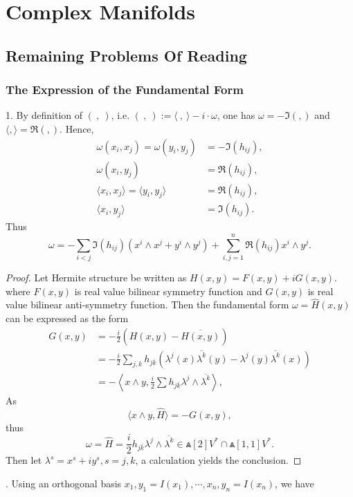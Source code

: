 \chapter{Complex Manifolds}
\section{Remaining Problems Of Reading}
\subsection{The Expression of the Fundamental Form}
1. By definition of $(~ ,~ )$, i.e. $(~,~) := \langle ~,~\rangle-i\cdot \omega$, one has $\omega=-\Im( , )$ and $\langle , \rangle=\Re( , )$. Hence,
\begin{subequations}\label{w expression}
  \begin{align}
\omega(x_i,x_j) =\omega(y_i,y_j) &=-\Im(h_{ij}),\\
\omega(x_i,y_j) &=\Re(h_{ij}),\\
\langle x_i ,x_j\rangle =\langle y_i,y_j\rangle &=\Re(h_{ij}),\\
\langle x_i,y_j\rangle &=\Im(h_{ij}).
\end{align}
\end{subequations}
Thus
\[
  \omega=-\sum_{i<j} \Im(h_{ij})(x^i\wedge x^j+y^i\wedge y^j )+\sum_{i,j=1}^{n}\Re(h_{ij})x^i\wedge y^j.
\]
\begin{proof}
  Let Hermite structure be written as $H(x,y)=F(x,y)+iG(x,y)$. where $F(x,y)$ is  real value bilinear symmetry function and $G(x,y)$ is  real value bilinear anti-symmetry function. Then the fundamental form $\omega=\widehat{H}(x,y)$ can be expressed as the form
  \begin{align*}
    G(x,y) &=-\frac{i}{2}(H(x,y)-\overline{H(x,y)})\\
    &=-\frac{i}{2}\sum_{j,k} h_{j\overline{k}} (\lambda^j(x)\overline{\lambda^k}(y)-\lambda^j (y)\overline{\lambda^k}(x))\\
    &=-\left\langle x\wedge y,\frac{i}{2}\sum h_{j\overline{k}} \lambda^j\wedge\overline{\lambda^k}\right\rangle,
  \end{align*}
  As 
  \[
    \langle x\wedge y, \widehat{H}\rangle=-G(x,y),
  \]
  thus 
  \[
    \omega=\widehat{H}=\frac{i}{2}h_{j\overline{k}} \lambda^j\wedge\overline{\lambda^k}\in \Wedge[2] V^*\cap \Wedge[1,1] V^*.
  \]
    Then let $\lambda^s=x^s+i y^s, s=j,k$, a calculation yields the conclusion\cite{LDG}.
\end{proof}
. Using an orthogonal basis $x_1,y_1=I(x_1), \cdots, x_n,y_n=I(x_n)$, we have 
